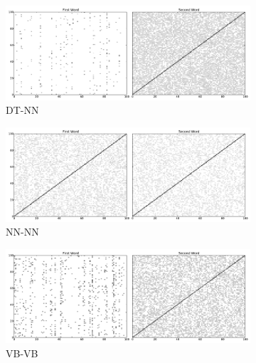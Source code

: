\documentclass[11pt,letterpaper]{article}
\begin{document}
\begin{figure}[t!]
	\begin{center}
	\begin{subfigure}{\columnwidth}
		\centering
		\includegraphics[width=\columnwidth,keepaspectratio=true]{./dt_nn.pdf}	
		\caption{\small DT-NN}
		\label{fig:dt_nn}			
	\end{subfigure}
	\begin{subfigure}{\columnwidth}
		\centering
		\includegraphics[width=\columnwidth,keepaspectratio=true]{./nn_nn.pdf}		
		\caption {\small NN-NN}
		\label{fig:nn_nn}
	\end{subfigure}
	\end{center}
	\begin{center}
	\begin{subfigure}{\columnwidth}
		\centering
		\includegraphics[width=\columnwidth,keepaspectratio=true]{./vb_vb.pdf}		
		\caption {\small VB-VB}
		\label{fig:vb_vb}
	\end{subfigure}
	\begin{subfigure}{\columnwidth}

\end{subfigure}
\end{center}
\end{figure}
\end{document}
